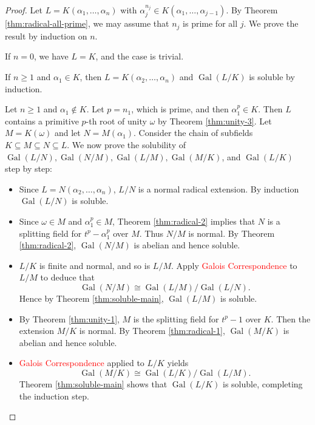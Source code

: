 \documentclass[12pt]{article}
\newcommand{\Gal}{\operatorname{Gal}}
\begin{document}
\begin{proof}
Let $L=K\left(\alpha_1, \ldots, \alpha_n\right)$ with $\alpha_j^{n_j} \in K\left(\alpha_1, \ldots, \alpha_{j-1}\right)$. By Theorem \ref{thm:radical-all-prime}, we may assume that $n_j$ is prime for all $j$. We prove the result by induction on $n$. 

If $n = 0$, we have $L = K$, and the case is trivial.

If $n \ge 1$ and $\alpha_1 \in K$, then $L=K\left(\alpha_2, \ldots, \alpha_n\right)$ and $\Gal(L / K)$ is soluble by induction.

Let $n \ge 1$ and $\alpha_1 \notin K$. Let $p = n_1$, which is prime, and then $\alpha_1^p \in K$.  Then $L$ contains a primitive $p$-th root of unity $\omega$ by Theorem \ref{thm:unity-3}. Let $M = K(\omega)$ and let $N = M(\alpha_1)$. Consider the chain of subfields $K \subseteq M \subseteq N \subseteq L$. We now prove the solubility of $\Gal(L/N), \Gal(N/M), \Gal(L/M), \Gal(M/K)$, and $\Gal(L/K)$ step by step:

\begin{itemize}
    \item Since $L=N\left(\alpha_2, \ldots, \alpha_n\right)$, $L / N$ is a normal radical extension. By induction $\Gal\left(L / N\right)$ is soluble. 
    \item Since $ \omega \in M$ and $\alpha_1^p \in M$, Theorem \ref{thm:radical-2} implies that $N$ is a splitting field for $t^p-\alpha_1^p$ over $M$. Thus $N / M$ is normal. By Theorem \ref{thm:radical-2}, $\Gal\left(N / M\right)$ is abelian and hence soluble. 
    \item  $L/ K$ is finite and normal, and so is $L / M$. Apply \textcolor{red}{Galois Correspondence} to $L / M$ to deduce that
    $$
    \Gal\left( N / M \right) \cong \Gal(L / M) / \Gal\left(L / N\right).
    $$
    Hence by Theorem \ref{thm:soluble-main},  $ \Gal(L / M)$ is soluble.
    \item By Theorem \ref{thm:unity-1}, $M$ is the splitting field for $t^p-1$ over $K$. Then the extension $M / K$ is normal. By Theorem \ref{thm:radical-1}, $\Gal(M / K)$ is abelian and hence soluble.
    \item  \textcolor{red}{Galois Correspondence} applied to $L / K$ yields
    $$
    \Gal(M / K) \cong \Gal(L / K) / \Gal(L / M). 
    $$
    Theorem \ref{thm:soluble-main} shows that $\Gal(L / K)$ is soluble, completing the induction step.
\end{itemize}
\end{proof}
\end{document}
